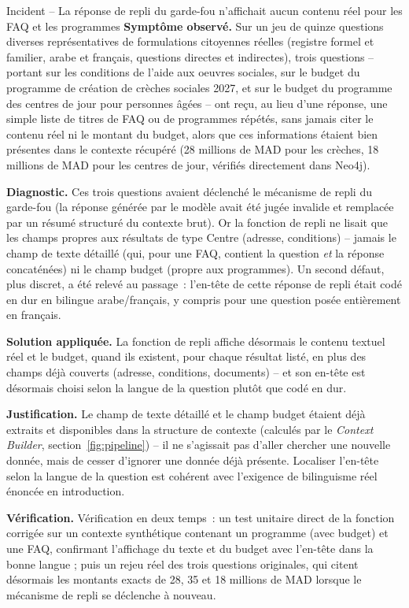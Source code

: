 \begin{probbox}{Incident -- La réponse de repli du garde-fou n'affichait aucun contenu réel pour les FAQ et les programmes}
\textbf{Symptôme observé.} Sur un jeu de quinze questions diverses représentatives de formulations citoyennes réelles (registre formel et familier, arabe et français, questions directes et indirectes), trois questions -- portant sur les conditions de l'aide aux oeuvres sociales, sur le budget du programme de création de crèches sociales 2027, et sur le budget du programme des centres de jour pour personnes âgées -- ont reçu, au lieu d'une réponse, une simple liste de titres de FAQ ou de programmes répétés, sans jamais citer le contenu réel ni le montant du budget, alors que ces informations étaient bien présentes dans le contexte récupéré (28 millions de MAD pour les crèches, 18 millions de MAD pour les centres de jour, vérifiés directement dans Neo4j).

\textbf{Diagnostic.} Ces trois questions avaient déclenché le mécanisme de repli du garde-fou (la réponse générée par le modèle avait été jugée invalide et remplacée par un résumé structuré du contexte brut). Or la fonction de repli ne lisait que les champs propres aux résultats de type Centre (adresse, conditions) -- jamais le champ de texte détaillé (qui, pour une FAQ, contient la question \emph{et} la réponse concaténées) ni le champ budget (propre aux programmes). Un second défaut, plus discret, a été relevé au passage~: l'en-tête de cette réponse de repli était codé en dur en bilingue arabe/français, y compris pour une question posée entièrement en français.

\textbf{Solution appliquée.} La fonction de repli affiche désormais le contenu textuel réel et le budget, quand ils existent, pour chaque résultat listé, en plus des champs déjà couverts (adresse, conditions, documents) -- et son en-tête est désormais choisi selon la langue de la question plutôt que codé en dur.

\textbf{Justification.} Le champ de texte détaillé et le champ budget étaient déjà extraits et disponibles dans la structure de contexte (calculés par le \emph{Context Builder}, section~\ref{fig:pipeline}) -- il ne s'agissait pas d'aller chercher une nouvelle donnée, mais de cesser d'ignorer une donnée déjà présente. Localiser l'en-tête selon la langue de la question est cohérent avec l'exigence de bilinguisme réel énoncée en introduction.

\textbf{Vérification.} Vérification en deux temps~: un test unitaire direct de la fonction corrigée sur un contexte synthétique contenant un programme (avec budget) et une FAQ, confirmant l'affichage du texte et du budget avec l'en-tête dans la bonne langue ; puis un rejeu réel des trois questions originales, qui citent désormais les montants exacts de 28, 35 et 18 millions de MAD lorsque le mécanisme de repli se déclenche à nouveau.
\end{probbox}
